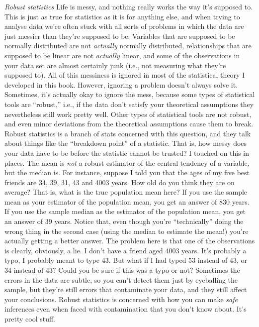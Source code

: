 \documentclass[
]{book}
\begin{document}
\begin{itemize}
  \emph{Robust statistics} Life is messy, and nothing really works the way it's supposed to. This is just as true for statistics as it is for anything else, and when trying to analyse data we're often stuck with all sorts of problems in which the data are just messier than they're supposed to be. Variables that are supposed to be normally distributed are not \emph{actually} normally distributed, relationships that are supposed to be linear are not \emph{actually} linear, and some of the observations in your data set are almost certainly junk (i.e., not measuring what they're supposed to). All of this messiness is ignored in most of the statistical theory I developed in this book. However, ignoring a problem doesn't always solve it. Sometimes, it's actually okay to ignore the mess, because some types of statistical tools are ``robust,'' i.e., if the data don't satisfy your theoretical assumptions they nevertheless still work pretty well. Other types of statistical tools are not robust, and even minor deviations from the theoretical assumptions cause them to break. Robust statistics is a branch of stats concerned with this question, and they talk about things like the ``breakdown point'' of a statistic. That is, how messy does your data have to be before the statistic cannot be trusted? I touched on this in places. The mean is \emph{not} a robust estimator of the central tendency of a variable, but the median is. For instance, suppose I told you that the ages of my five best friends are 34, 39, 31, 43 and 4003 years. How old do you think they are on average? That is, what is the true population mean here? If you use the sample mean as your estimator of the population mean, you get an answer of 830 years. If you use the sample median as the estimator of the population mean, you get an answer of 39 years. Notice that, even though you're ``technically'' doing the wrong thing in the second case (using the median to estimate the mean!) you're actually getting a better answer. The problem here is that one of the observations is clearly, obviously, a lie. I don't have a friend aged 4003 years. It's probably a typo, I probably meant to type 43. But what if I had typed 53 instead of 43, or 34 instead of 43? Could you be sure if this was a typo or not? Sometimes the errors in the data are subtle, so you can't detect them just by eyeballing the sample, but they're still errors that contaminate your data, and they still affect your conclusions. Robust statistics is concerned with how you can make \emph{safe} inferences even when faced with contamination that you don't know about. It's pretty cool stuff.
\end{itemize}
\end{document}
